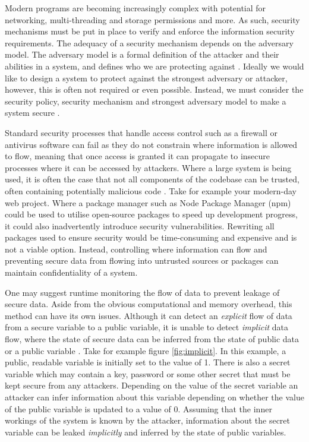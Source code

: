 \documentclass[twocolumn]{article}
\begin{document}
    Modern programs are becoming increasingly complex with potential for networking, multi-threading and storage permissions and more. As such, security mechanisms must be put in place to verify and enforce the information security requirements. The adequacy of a security mechanism depends on the adversary model. The adversary model is a formal definition of the attacker and their abilities in a system, and defines who we are protecting against \cite{do2019role}. Ideally we would like to design a system to protect against the strongest adversary or attacker, however, this is often not required or even possible. Instead, we must consider the security policy, security mechanism and strongest adversary model to make a system secure \cite{balliu2014logics}.
    
    Standard security processes that handle access control such as a firewall or antivirus software can fail as they do not constrain where information is allowed to flow, meaning that once access is granted it can propagate to insecure processes where it can be accessed by attackers. Where a large system is being used, it is often the case that not all components of the codebase can be trusted, often containing potentially malicious code \cite{sabelfeld2003language}. Take for example your modern-day web project. Where a package manager such as Node Package Manager (npm) could be used to utilise open-source packages to speed up development progress, it could also inadvertently introduce security vulnerabilities. Rewriting all packages used to ensure security would be time-consuming and expensive and is not a viable option. Instead, controlling where information can flow and preventing secure data from flowing into untrusted sources or packages can maintain confidentiality of a system. 
    
    One may suggest runtime monitoring the flow of data to prevent leakage of secure data. Aside from the obvious computational and memory overhead, this method can have its own issues. Although it can detect an \textit{explicit} flow of data from a secure variable to a public variable, it is unable to detect \textit{implicit} data flow, where the state of secure data can be inferred from the state of public data or a public variable \cite{denning1977certification}. Take for example figure \ref{fig:implicit}. In this example, a public, readable variable is initially set to the value of 1. There is also a secret variable which may contain a key, password or some other secret that must be kept secure from any attackers. Depending on the value of the secret variable an attacker can infer information about this variable depending on whether the value of the public variable is updated to a value of 0. Assuming that the inner workings of the system is known by the attacker, information about the secret variable can be leaked \textit{implicitly} and inferred by the state of public variables.
\end{document}
